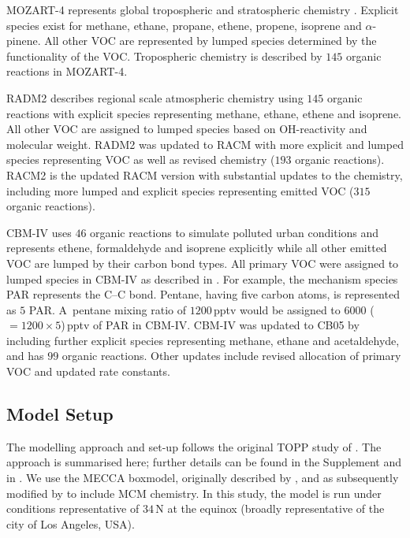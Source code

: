 \documentclass[acpd, online, hvmath]{copernicus}
\begin{document}
MOZART-4 represents global tropospheric and stratospheric chemistry
\citep{Emmons:2010}.  Explicit species exist for methane, ethane,
propane, ethene, propene, isoprene and $\alpha$-pinene.  All other VOC
are represented by lumped species determined by the functionality of
the VOC. Tropospheric chemistry is described by $145$ organic reactions in MOZART-4.

RADM2 \citep{Stockwell:1990} describes regional scale atmospheric
chemistry using $145$ organic reactions with explicit species representing methane, ethane, ethene
and isoprene.  All other VOC are assigned to lumped species based on
OH-reactivity and molecular weight.  RADM2 was updated to RACM
\citep{Stockwell:1997} with more explicit and lumped species
representing VOC as well as revised chemistry ($193$ organic reactions).  RACM2 is the updated
RACM version \citep{Goliff:2013} with substantial updates to the
chemistry, including more lumped and explicit species representing
emitted VOC ($315$ organic reactions).

CBM-IV \citep{Gery:1989} uses $46$ organic reactions to simulate polluted urban conditions and
represents ethene, formaldehyde and isoprene explicitly while all
other emitted VOC are lumped by their carbon bond types.  All primary
VOC were assigned to lumped species in CBM-IV as described in
\citet{Hogo:1989}.  For example, the mechanism species PAR represents
the C--C bond.  Pentane, having five carbon atoms, is represented as
$5$ PAR.  A~pentane mixing ratio of $1200$\,\unit{pptv} would be
assigned to $6000$ ($= 1200 \times 5$)\,pptv of PAR in CBM-IV.  CBM-IV
was updated to CB05 \citep{Yarwood:2005} by including further explicit
species representing methane, ethane and acetaldehyde, and has $99$ organic reactions.  Other updates
include revised allocation of primary VOC and updated rate constants.
\subsection{Model Setup} \label{ss:model_setup} The modelling approach
and set-up follows the original TOPP study of \citet{Butler:2011}.
The approach is summarised here; further details can be found in the
Supplement and in \citet{Butler:2011}.  We use
the MECCA boxmodel, originally described by \citet{Sander:2005}, and
as subsequently modified by \citet{Butler:2011} to include MCM
chemistry.  In this study, the model is run under conditions
representative of $34${\degree}\,N at the
equinox (broadly representative of the city of Los Angeles, USA).
\end{document}
